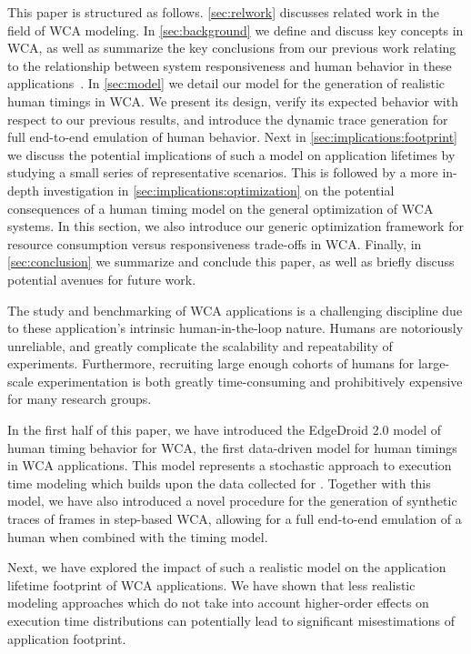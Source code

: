 This paper is structured as follows.
\cref{sec:relwork} discusses related work in the field of \acl{WCA} modeling.
In \cref{sec:background} we define and discuss key concepts in \ac{WCA}, as well as summarize the key conclusions from our previous work relating to the relationship between system responsiveness and human behavior in these applications~\cite{olguinmunoz:impact2021}.
In \cref{sec:model} we detail our model for the generation of realistic human timings in \ac{WCA}.
We present its design, verify its expected behavior with respect to our previous results, and introduce the dynamic trace generation for full end-to-end emulation of human behavior.
Next in \cref{sec:implications:footprint} we discuss the potential implications of such a model on application lifetimes by studying a small series of representative scenarios.
This is followed by a more in-depth investigation in \cref{sec:implications:optimization} on the potential consequences of a human timing model on the general optimization of \ac{WCA} systems.
In this section, we also introduce our generic optimization framework for resource consumption versus responsiveness trade-offs in \ac{WCA}.
Finally, in \cref{sec:conclusion} we summarize and conclude this paper, as well as briefly discuss potential avenues for future work.

The study and benchmarking of \ac{WCA} applications is a challenging discipline due to these application's intrinsic human-in-the-loop nature.
Humans are notoriously unreliable, and greatly complicate the scalability and repeatability of experiments.
Furthermore, recruiting large enough cohorts of humans for large-scale experimentation is both greatly time-consuming and prohibitively expensive for many research groups.

In the first half of this paper, we have introduced the EdgeDroid 2.0 model of human timing behavior for \ac{WCA}, the first data-driven model for human timings in \ac{WCA} applications.
This model represents a stochastic approach to execution time modeling which builds upon the data collected for \textcite{olguinmunoz:impact2021}.
Together with this model, we have also introduced a novel procedure for the generation of synthetic traces of frames in step-based \ac{WCA}, allowing for a full end-to-end emulation of a human when combined with the timing model.

Next, we have explored the impact of such a realistic model on the application lifetime footprint of \ac{WCA} applications.
We have shown that less realistic modeling approaches which do not take into account higher-order effects on execution time distributions can potentially lead to significant misestimations of application footprint.

